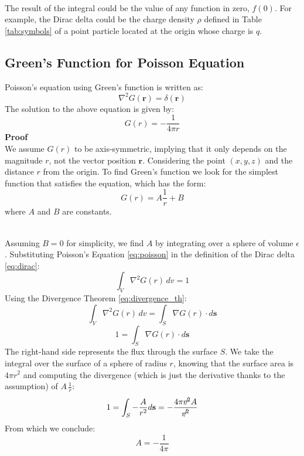 \documentclass[main]{subfiles}
\begin{document}
\noindent\\
The result of the integral could be the value of any function in zero, $f(0)$.
For example, the Dirac delta could be the charge density $\rho$ defined in 
Table \ref{tab:symbols} 
of a point particle located at the origin whose charge is \(q\).

\subsection{Green's Function for Poisson Equation}
Poisson's equation using Green's function is written as:
\begin{equation}
\nabla^2 G(\mathbf{r}) = \delta(\mathbf{r})
\label{eq:poisson}
\end{equation}
The solution to the above equation is given by:
\[
G(r) =  - \frac{1}{4 \pi r}
\]
\textbf{Proof}\noindent\\
We assume \(G(r)\) to be axis-symmetric, implying that it only depends on the 
magnitude $r$, not the vector position $\mathbf{r}$.
Considering the point \((x,y,z)\) and the distance \(r\) from the origin.
To find Green's function we look for the simplest function that satisfies the 
equation, which has the form:
\[
G(r) = A \frac{1}{r} + B
\]
where \(A\) and \(B\) are constants. 

\noindent\\
Assuming \(B = 0\) for simplicity, we find \(A\) by integrating over a sphere of 
volume $\epsilon$.
Substituting Poisson's Equation \eqref{eq:poisson} in the definition of the 
Dirac delta \eqref{eq:dirac}:
\[
\int_V \nabla^2 G(r) \, dv = 1 
\]
Using the Divergence Theorem \eqref{eq:divergence_th}:
\[
\int_V \nabla^2 G(r) \, dv = \int_S \nabla G(r) \cdot d\mathbf{s} 
\]
\[
1 = \int_S \nabla G(r) \cdot d\mathbf{s} 
\]
The right-hand side represents the flux through the surface \(S\). We take the 
integral over the surface of a sphere of radius \(r\), knowing that the surface 
area is \(4 \pi r^2\) and computing the divergence (which is just the derivative 
thanks to the assumption) of $A \, \frac{1}{r}$:
\[
1 = \int_S - \frac{A}{r^2} d\mathbf{s} = - \frac{4 \pi \slashed{r^2} 
A}{\slashed{r^2}}
\]
From which we conclude:
\[
A = - \frac{1}{4 \pi}
\]
\end{document}
